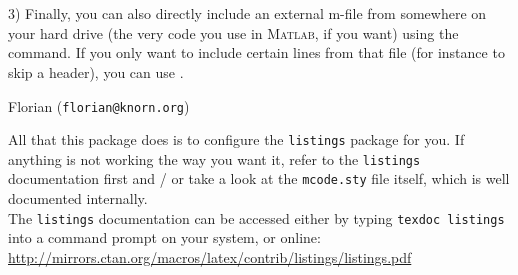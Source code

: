 \documentclass{article}
\begin{document}
3) Finally, you can also directly include an external m-file from somewhere on your hard drive (the very code you use in \textsc{Matlab}, if you want) using the \verb|| command.  If you only want to include certain lines from that file (for instance to skip a header), you can use \verb||.

\medskip


Florian (\texttt{florian@knorn.org})

\begin{center}
\begin{minipage}{.75\linewidth}

	All that this package does is to configure the \verb|listings| package for you. If anything is not working the way you want it, refer to the \verb|listings| documentation first and / or take a look at the \verb|mcode.sty| file itself, which is well documented internally.\\
	
	The \verb|listings| documentation can be accessed either by typing \verb|texdoc listings| into a command prompt on your system, or online:\\\scriptsize\url{http://mirrors.ctan.org/macros/latex/contrib/listings/listings.pdf}
	
\end{minipage}
\end{center}
\end{document}
